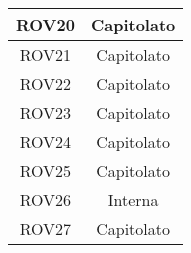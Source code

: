 \begin{longtable}{|c|c|}
\midrule
ROV20
& Capitolato\\

\midrule
ROV21
& Capitolato\\

\midrule
ROV22
& Capitolato\\

\midrule
ROV23
& Capitolato\\

\midrule
ROV24
& Capitolato\\

\midrule
ROV25
& Capitolato\\

\midrule
ROV26
& Interna\\

\midrule
ROV27
& Capitolato\\

\end{longtable}


